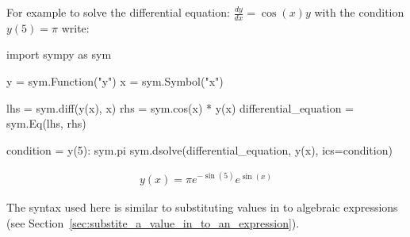 For example to solve the differential equation: \(\frac{dy}{dx} = \cos(x) y\)
with the condition \(y(5)= \pi\) 
write:




\begin{pyin}
import sympy as sym

y = sym.Function("y")
x = sym.Symbol("x")

lhs = sym.diff(y(x), x)
rhs = sym.cos(x) * y(x)
differential_equation = sym.Eq(lhs, rhs)

condition = {y(5): sym.pi}
sym.dsolve(differential_equation, y(x), ics=condition)
\end{pyin}




\begin{equation*}
\begin{split}\displaystyle y{\left(x \right)} = \pi e^{- \sin{\left(5 \right)}} e^{\sin{\left(x \right)}}\end{split}
\end{equation*}



\begin{note}
The syntax used here is similar to substituting values in to algebraic
expressions (see Section~\ref{sec:substite_a_value_in_to_an_expression}).
\end{note}





